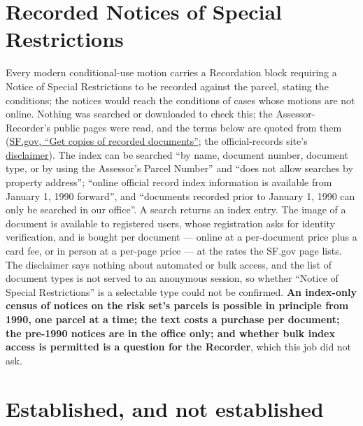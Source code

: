 \documentclass[11pt]{article}
\begin{document}
\section{Recorded Notices of Special Restrictions}
\label{sec:nsr}

Every modern conditional-use motion carries a Recordation block requiring a Notice of Special
Restrictions to be recorded against the parcel, stating the conditions; the notices would reach
the conditions of cases whose motions are not online. Nothing was searched or downloaded to
check this; the Assessor-Recorder's public pages were read, and the terms below are quoted from
them (\href{https://www.sf.gov/get-copies-recorded-documents}{SF.gov, ``Get copies of recorded
documents''}; the official-records site's
\href{https://recorder.sfgov.org/html/DisclaimerContent.html}{disclaimer}). The index can be
searched ``by name, document number, document type, or by using the Assessor's Parcel Number''
and ``does not allow searches by property address''; ``online official record index information
is available from January 1, 1990 forward'', and ``documents recorded prior to January 1, 1990
can only be searched in our office''. A search returns an index entry. The image of a document
is available to registered users, whose registration asks for identity verification, and is
bought per document --- online at a per-document price plus a card fee, or in person at a
per-page price --- at the rates the SF.gov page lists. The disclaimer says nothing about
automated or bulk access, and the list of document types is not served to an anonymous
session, so whether ``Notice of Special Restrictions'' is a selectable type could not be
confirmed. \textbf{An index-only census of notices on the risk set's parcels is possible in
principle from 1990, one parcel at a time; the text costs a purchase per document; the
pre-1990 notices are in the office only; and whether bulk index access is permitted is a
question for the Recorder}, which this job did not ask.

\section{Established, and not established}
\end{document}
